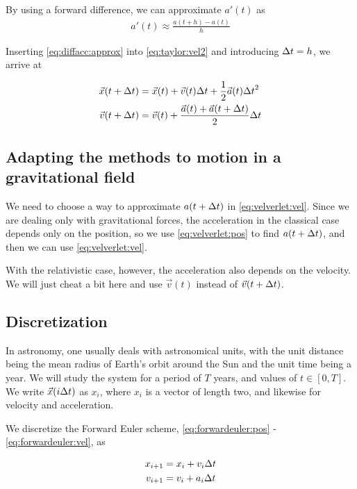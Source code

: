\documentclass[a4paper]{article}
\begin{document}
By using a forward difference, we can approximate $a'(t)$ as
\begin{align}
    a'(t) \approx \frac{a(t+h) - a(t)}{h} \label{eq:diffacc:approx}
\end{align}

Inserting \ref{eq:diffacc:approx} into \ref{eq:taylor:vel2} and introducing ${\Delta t} = h$, we arrive at

\begin{align}
\vec{x}(t + {\Delta t}) &= \vec{x}(t) + \vec{v}(t){\Delta t} + \frac{1}{2} \vec{a}(t) {\Delta t}^2 \label{eq:velverlet:pos} \\
\vec{v}(t + {\Delta t}) &= \vec{v}(t) + \frac{\vec{a}(t) + \vec{a}(t + {\Delta t})}{2} {\Delta t} \label{eq:velverlet:vel}
\end{align}

\subsection{Adapting the methods to motion in a gravitational field}

We need to choose a way to approximate $a(t + {\Delta t})$ in \ref{eq:velverlet:vel}. Since we are dealing only with gravitational forces, the acceleration in the classical case depends only on the position, so we use \ref{eq:velverlet:pos} to find $a(t + {\Delta t})$, and then we can use \ref{eq:velverlet:vel}.

With the relativistic case, however, the acceleration also depends on the velocity. We will just cheat a bit here and use $\vec{v}(t)$ instead of $\vec{v}(t + {\Delta t})$.


\subsection{Discretization}
In astronomy, one usually deals with astronomical units, with the unit distance being the mean radius of Earth's orbit around the Sun and the unit time being a year. We will study the system for a period of $T$ years, and values of $t \in [0, T]$. We write $\vec{x}(i {\Delta t})$ as $x_i$, where $x_i$ is a vector of length two, and likewise for velocity and acceleration.

We discretize the Forward Euler scheme, \ref{eq:forwardeuler:pos} - \ref{eq:forwardeuler:vel}, as

\begin{align}
    x_{i+1} &= x_{i} + v_{i}{\Delta t} \\
    v_{i+1} &= v_{i} + a_{i}{\Delta t}
\end{align}
\end{document}
